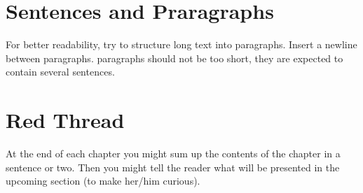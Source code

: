 \section{Sentences and Praragraphs}

For better readability, try to structure long text into paragraphs. Insert 
a newline between paragraphs. paragraphs should not be too short, they are 
expected to contain several sentences. 

\section{Red Thread} %

At the end of each chapter you might sum up the contents of the chapter in 
a sentence or two. Then you might tell the reader what will be presented in 
the upcoming section (to make her/him curious).



\vfill
\chapterend


